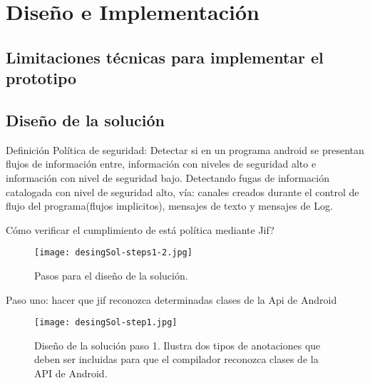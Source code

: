 \label{ch:desing}
\chapter{Diseño e Implementación}

\section{Limitaciones técnicas para implementar el prototipo}

\section{Diseño de la solución} 
Definición Política de seguridad:\newline
Detectar si en un programa android se presentan flujos de información entre,
información con niveles de seguridad alto e información con nivel de seguridad
bajo.\newline 
Detectando fugas de información catalogada con nivel de seguridad alto, vía:
canales creados durante el control de flujo del programa(flujos implicitos),
mensajes de texto y mensajes de Log. \newline

Cómo verificar el cumplimiento de está política mediante Jif?\newline
\begin{figure}[h!]
	\begin{center}
	\texttt{[image: desingSol-steps1-2.jpg]}
	\end{center}
	\caption{Pasos para el diseño de la solución.}
	\label{fig:desingSol-steps1-2}
\end{figure}

Paso uno: hacer que jif reconozca determinadas clases de la Api de
Android\newline 

\begin{figure}[h!]
	\begin{center}
	\texttt{[image: desingSol-step1.jpg]}
	\end{center}
	\caption{Diseño de la solución paso 1. Ilustra dos tipos de anotaciones que
	deben ser incluidas para que el compilador reconozca clases de la API de
	Android.}
	\label{fig:desingSol-step1}
\end{figure}

